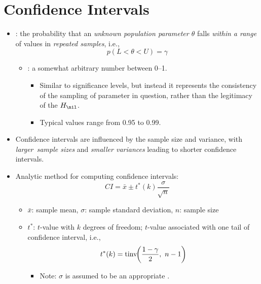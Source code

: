 \section{Confidence Intervals}
\begin{itemize}
  \item {}: the probability that an \emph{unknown population parameter \(\theta\)} falls \emph{within a range} of values in \emph{repeated samples}, i.e.,
  \[%
  p(L < \theta < U) = \gamma
  \]%
  \begin{itemize}
    \item {}: a somewhat arbitrary number between 0--1.
      \begin{itemize}
        \item Similar to significance levels, but instead it represents the consistency of the sampling of parameter in question, rather than the legitimacy of the \(H_\nil\).
        \item Typical values range from 0.95 to 0.99.
      \end{itemize}
  \end{itemize}
  \item Confidence intervals are influenced by the sample size and variance, with \emph{larger~sample sizes} and \emph{smaller variances} leading to shorter confidence intervals.
  \item Analytic method for computing confidence intervals:
  \[%
  CI = \bar{x}\pm t^*(k)\frac{\sigma}{\sqrt{n}}
  \]%
  \begin{itemize}
    \item \(\bar{x}\): sample mean, \(\sigma\): sample standard deviation, \(n\): sample size
    \item \(t^*\): \(t\)-value with \(k\) degrees of freedom; \(t\)-value associated with one tail of confidence interval, i.e.,
    \[%
    t^*(k) = \operatorname{tinv}\hspace{-3pt}\left(\frac{1-\gamma}{2},~ n-1\right)
    \]%
    \begin{itemize}
      \item Note: \(\sigma\) is assumed to be an appropriate \hyperref[Chapter: Analysis of Variance]{}.
    \end{itemize}
    

\end{itemize}
\end{itemize}
